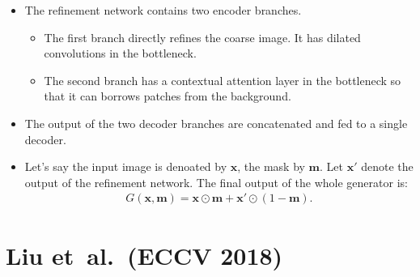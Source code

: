 \documentclass[10pt]{article}
\newcommand{\ve}[1]{\mathbf{#1}}
\newcommand{\etal}{{et~al.}}
\begin{document}
  \begin{itemize}
    \item The refinement network contains two encoder branches.
    \begin{itemize}
      \item The first branch directly refines the coarse image. It has dilated convolutions in the bottleneck.
      \item The second branch has a contextual attention layer in the bottleneck so that it can borrows patches from the background.
    \end{itemize} 

    \item The output of the two decoder branches are concatenated and fed to a single decoder.

    \item Let's say the input image is denoated by $\ve{x}$, the mask by $\ve{m}$. Let $\ve{x}'$ denote the output of the refinement network. The final output of the whole generator is:
    \begin{align*}
      G(\ve{x},\ve{m}) = \ve{x} \odot \ve{m} + \ve{x}' \odot (1 - \ve{m}).
    \end{align*}
  \end{itemize}

  \section{Liu \etal~(ECCV 2018)}
\end{document}
